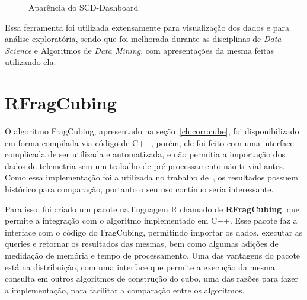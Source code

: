 \begin{figure}[ht]
	\caption{Aparência do SCD-Dashboard}\label{fig:scddashboard}
	\vspace{6mm}
	\begin{center}
	\end{center}
	\vspace{4mm}
	\legenda{}
\end{figure}

Essa ferramenta foi utilizada extensamente para visualização dos dados e para análise exploratória, sendo que foi melhorada durante as disciplinas de \textit{Data Science} e Algoritmos de \textit{Data Mining}, com apresentações da mesma feitas utilizando ela.

\section{RFragCubing}\label{ch:impl:rfrag}

O algoritmo FragCubing, apresentado na seção~\ref{ch:corr:cube}, foi disponibilizado em forma compilada via código de C++, porém, ele foi feito com uma interface complicada de ser utilizada e automatizada, e não permitia a importação dos dados de telemetria sem um trabalho de pré-processamento não trivial antes.
Como essa implementação foi a utilizada no trabalho de~\cite{silva:2015:abordagensParaCubo}, os resultados possuem histórico para comparação, portanto o seu uso contínuo seria interessante.

Para isso, foi criado um pacote na linguagem R chamado de \textbf{RFragCubing}, que permite a integração com o algoritmo implementado em C++.
Esse pacote faz a interface com o código do FragCubing, permitindo importar os dados, executar as queries e retornar os resultados das mesmas, bem como algumas adições de medidação de memória e tempo de processamento.
Uma das vantagens do pacote está na distribuição, com uma interface que permite a execução da mesma consulta em outros algoritmos de construção do cubo, uma das razões para fazer a implementação, para facilitar a comparação entre os algoritmos.

